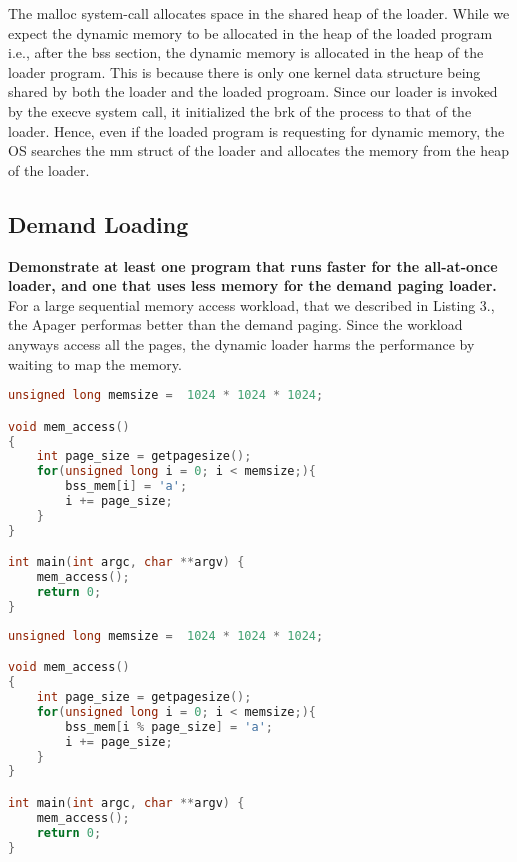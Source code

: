 \documentclass{article}
\begin{document}
The malloc system-call allocates space in the shared heap of the loader. While we expect the dynamic 
memory to be allocated in the heap of the loaded program i.e., after the bss section, the dynamic memory 
is allocated in the heap of the loader program. This is because there is only one kernel data structure 
being shared by both the loader and the loaded progroam. Since our loader is invoked by the execve system call,
it initialized the brk of the process to that of the loader. Hence, even if the loaded program is requesting
for dynamic memory, the OS searches the mm struct of the loader and allocates the memory from the heap of 
the loader.\\

\subsection{Demand Loading}

\textbf{Demonstrate at least one program that runs faster for the all-at-once loader, and one that uses less memory for the demand paging loader.}\\

For a large sequential memory access workload, that we described in Listing 3., the Apager performas better 
than the demand paging. Since the workload anyways access all the pages, the dynamic loader harms the 
performance by waiting to map the memory.\\ 

\noindent\begin{minipage}{.45\textwidth}
\begin{lstlisting}[language=C, caption=Sequential Access of a Large Array, basicstyle=\tiny]
unsigned long memsize =  1024 * 1024 * 1024;

void mem_access()
{
    int page_size = getpagesize();
    for(unsigned long i = 0; i < memsize;){
        bss_mem[i] = 'a';
        i += page_size;
    }
}

int main(int argc, char **argv) {
    mem_access();
    return 0;
}
\end{lstlisting}
\end{minipage}\hfill
\begin{minipage}{.45\textwidth}
\begin{lstlisting}[language=C, caption=Small Access of a Large Array, basicstyle=\tiny]
unsigned long memsize =  1024 * 1024 * 1024;

void mem_access()
{
    int page_size = getpagesize();
    for(unsigned long i = 0; i < memsize;){
        bss_mem[i % page_size] = 'a';
        i += page_size;
    }
}

int main(int argc, char **argv) {
    mem_access();
    return 0;
}

\end{lstlisting}
\end{minipage}
\end{document}
